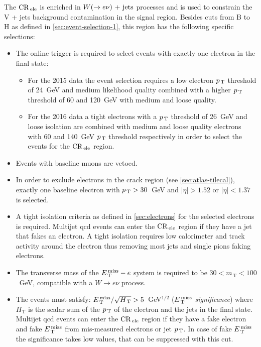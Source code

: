 The $\mathrm{CR}_\mathrm{\, ele}$ is enriched in $W (\rightarrow e \nu)\mathrm{~+~jets}$ processes and is used to constrain
the V + jets background contamination in the signal region. Besides cuts from B
to H as defined in \cref{sec:event-selection-1}, this region has the following
specific selections:
\begin{itemize}
\item The online trigger is required to select events with exactly one electron
  in the final state:
  \begin{itemize}
  \item For the 2015 data the event selection requires a low electron $p_\mathrm{\, T}$
    threshold of 24~GeV and medium likelihood quality combined with a higher
    $p_\mathrm{\, T}$ threshold of 60 and 120~GeV with medium and loose quality.
  \item For the 2016 data a tight electrons with a $p_\mathrm{\, T}$ threshold of 26~GeV and
    loose isolation are combined with medium and loose quality electrons with 60
    and 140~GeV $p_\mathrm{\, T}$ threshold respectively in order to select the events for
    the $\mathrm{CR}_\mathrm{\, ele}$ region.
  \end{itemize}
\item Events with baseline muons are vetoed.
\item In order to exclude electrons in the crack region (see
  \cref{sec:atlas-tilecal}), exactly one baseline electron with $p_\mathrm{\, T} > 30$~GeV
  and $|\eta| > 1.52$ or $|\eta| < 1.37$ is selected.
\item A tight isolation criteria as defined in \cref{sec:electrons} for the
  selected electrons is required. Multijet \gls{qcd} events can enter the
  $\mathrm{CR}_\mathrm{\, ele}$ region if they have a jet that fakes an electron. A tight isolation
  requires low calorimeter and track activity around the electron thus removing
  most jets and single pions faking electrons. \pagebreak[4]
\item The transverse mass of the $E_\mathrm{\, T}^\mathrm{\, miss} - e$ system is required to be
  $30 < m_\mathrm{\, T} < 100$~GeV, compatible with a $W \rightarrow e \nu$
  process.
\item The events must satisfy: $E_\mathrm{\, T}^\mathrm{\, miss}/\sqrt{H_\mathrm{\, T}} > 5$~GeV$^{1/2}$
  ($E_\mathrm{\, T}^\mathrm{\, miss}$ \emph{significance}) where $H_\mathrm{T}$ is the scalar sum of the
  $p_\mathrm{\, T}$ of the electron and the jets in the final state. Multijet \gls{qcd}
  events can enter the $\mathrm{CR}_\mathrm{\, ele}$ region if they have a fake electron and fake
  $E_\mathrm{\, T}^\mathrm{\, miss}$ from mis-measured electrons or jet $p_\mathrm{\, T}$. In case of fake $E_\mathrm{\, T}^\mathrm{\, miss}$ the
  significance takes low values, that can be suppressed with this cut.
\end{itemize}
